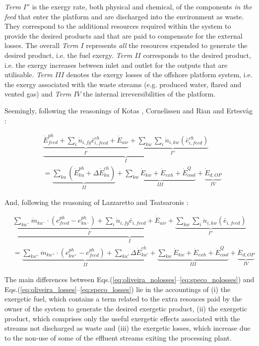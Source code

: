 \documentclass[times,3p]{elsarticle}
\begin{document}
\emph{Term $I''$} is the exergy rate, both physical and chemical, of the components \emph{in the feed} that enter the platform and are discharged into the environment as waste. They correspond to the additional resources required within the system to provide the desired products and that are paid to compensate for the external losses. The overall \emph{Term $I$} represents \emph{all} the resources expended to generate the desired product, i.e. the fuel exergy. \emph{Term $II$} corresponds to the desired product, i.e. the exergy increases between inlet and outlet for the outputs that are utilisable. \emph{Term $III$} denotes the exergy losses of the offshore platform system, i.e. the exergy associated with the waste streams (e.g. produced water, flared and vented gas) and \emph{Term $IV$} the internal irreversibilities of the platform. 

Seemingly, following the reasonings of Kotas \cite{Kotas1995}, Cornelissen \cite{Cornelissen1997} and Rian and Ertesv\aa g \cite{Rian2012}:

\begin{align}
		&\underbrace{\underbrace{\dot{E}^{ph}_{feed}+\sum_i \dot{n}_{i,fg}\bar{e}^{ch}_{i,feed}+\dot{E}_{air}}_{I'}+\underbrace{\sum_{kw}\sum_i \dot{n}_{i,kw}(\bar{e}^{ch}_{i,feed})}_{I''}}_{I} \nonumber\\
		&=\underbrace{\sum_{ku}\left(\dot{E}^{ph}_{ku}+\Delta{\dot{E}}^{ch}_{ku}\right)}_{II}+\underbrace{\sum_{kw} \dot{E}_{kw}+\dot{E}_{exh}+\dot{E}^Q_{cool}}_{III}+\underbrace{\dot{E}_{d,OP}}_{IV}
\label{eq:rian_losses}
\end{align}

And, following the reasoning of Lazzaretto and Tsatsaronis \cite{Lazzaretto1999,Lazzaretto2006}:

 \begin{align}
	&\underbrace{\underbrace{\sum_{ku^{-}} \dot{m}_{ku^{-}}\cdot(e_{feed}^{ph}-e_{ku^{-}}^{ph})+\sum_i \dot{n}_{i,fg}\bar{e}_{i,feed}+\dot{E}_{air}}_{I'}+\underbrace{\sum_{kw}\sum_i \dot{n}_{i,kw}(\bar{e}_{i,feed})}_{I''}}_{I} \nonumber\\
	&=\underbrace{\sum_{ku^{+}}\dot{m}_{ku^{+}}\cdot(e_{ku^{+}}^{ph}-e_{feed}^{ph})+\sum_{ku'}\Delta{\dot{E}}^{ch}_{ku'}}_{II}+\underbrace{\sum_{kw} \dot{E}_{kw}+\dot{E}_{exh}+\dot{E}^Q_{cool}}_{III}+\underbrace{\dot{E}_{d,OP}}_{IV}
	\label{eq:speco_losses}
\end{align}	

The main differences between Eqs.(\ref{eq:oliveira_nolosses}--\ref{eq:speco_nolosses}) and Eqs.(\ref{eq:oliveira_losses}--\ref{eq:speco_losses}) lie in the accountings of (i) the exergetic fuel, which contains a term related to the extra resouces paid by the owner of the system to generate the desired exergetic product, (ii) the exergetic product, which comprises only the useful exergetic effects associated with the streams not discharged as waste and (iii) the exergetic losses, which increase due to the non-use of some of the effluent streams exiting the processing plant. 
\end{document}
